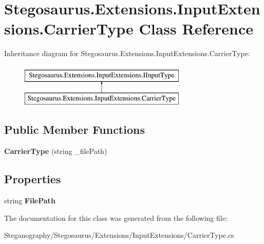 \hypertarget{class_stegosaurus_1_1_extensions_1_1_input_extensions_1_1_carrier_type}{}\section{Stegosaurus.\+Extensions.\+Input\+Extensions.\+Carrier\+Type Class Reference}
\label{class_stegosaurus_1_1_extensions_1_1_input_extensions_1_1_carrier_type}
Inheritance diagram for Stegosaurus.\+Extensions.\+Input\+Extensions.\+Carrier\+Type\+:\begin{figure}[H]
\begin{center}
\leavevmode
\includegraphics[height=2.000000cm]{class_stegosaurus_1_1_extensions_1_1_input_extensions_1_1_carrier_type}
\end{center}
\end{figure}
\subsection*{Public Member Functions}
\begin{DoxyCompactItemize}
\item 
{\bfseries Carrier\+Type} (string \+\_\+file\+Path)\hypertarget{class_stegosaurus_1_1_extensions_1_1_input_extensions_1_1_carrier_type_ae569efa478f5707bd4bfd0bb865f5fe0}{}\label{class_stegosaurus_1_1_extensions_1_1_input_extensions_1_1_carrier_type_ae569efa478f5707bd4bfd0bb865f5fe0}

\end{DoxyCompactItemize}
\subsection*{Properties}
\begin{DoxyCompactItemize}
\item 
string {\bfseries File\+Path}\hypertarget{class_stegosaurus_1_1_extensions_1_1_input_extensions_1_1_carrier_type_a6a473cc6d65d9d2360cf644e63f34478}{}\label{class_stegosaurus_1_1_extensions_1_1_input_extensions_1_1_carrier_type_a6a473cc6d65d9d2360cf644e63f34478}

\end{DoxyCompactItemize}


The documentation for this class was generated from the following file\+:\begin{DoxyCompactItemize}
\item 
Steganography/\+Stegosaurus/\+Extensions/\+Input\+Extensions/Carrier\+Type.\+cs\end{DoxyCompactItemize}
